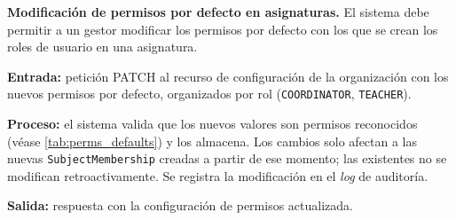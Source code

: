 \begin{functional}
    \item \textbf{Modificación de permisos por defecto en asignaturas.}
    \label{rf:config:default_perms}
    El sistema debe permitir a un gestor modificar los permisos por defecto con los que se
    crean los roles de usuario en una asignatura.

    \textbf{Entrada:} petición PATCH al recurso de configuración de la organización con los
    nuevos permisos por defecto, organizados por rol (\texttt{COORDINATOR},
    \texttt{TEACHER}).

    \textbf{Proceso:} el sistema valida que los nuevos valores son permisos reconocidos
    (véase \cref{tab:perms_defaults}) y los almacena. Los cambios solo afectan a las nuevas
    \texttt{SubjectMembership} creadas a partir de ese momento; las existentes no se
    modifican retroactivamente. Se registra la modificación en el \textit{log} de auditoría.

    \textbf{Salida:} respuesta con la configuración de permisos actualizada.

\end{functional}
